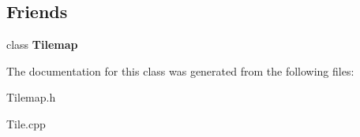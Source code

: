 \subsection*{Friends}
\begin{DoxyCompactItemize}
\item 
\hypertarget{class_edda_1_1_tile_abb3e8d219d526d16e351f7282f6a8bed}{
class {\bfseries Tilemap}}
\label{class_edda_1_1_tile_abb3e8d219d526d16e351f7282f6a8bed}

\end{DoxyCompactItemize}


The documentation for this class was generated from the following files:\begin{DoxyCompactItemize}
\item 
Tilemap.h\item 
Tile.cpp\end{DoxyCompactItemize}

